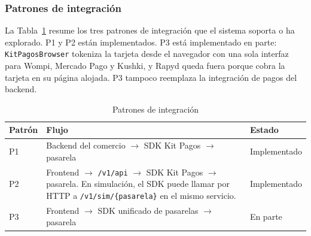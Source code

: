 \subsubsection{Patrones de integración}
La Tabla~\ref{tab:patrones} resume los tres patrones de integración que el sistema soporta o ha explorado. P1 y P2 están implementados. P3 está implementado en parte: \texttt{KitPagosBrowser} tokeniza la tarjeta desde el navegador con una sola interfaz para Wompi, Mercado Pago y Kushki, y Rapyd queda fuera porque cobra la tarjeta en su página alojada. P3 tampoco reemplaza la integración de pagos del backend.

\begin{table}[htbp]
\centering
\caption{Patrones de integración}
\label{tab:patrones}
\renewcommand{\arraystretch}{1.3}
\begin{tabularx}{\textwidth}{|l|X|l|}
\hline
\textbf{Patrón} & \textbf{Flujo} & \textbf{Estado} \\ \hline
P1 & Backend del comercio $\rightarrow$ SDK Kit Pagos $\rightarrow$ pasarela & Implementado \\ \hline
P2 & Frontend $\rightarrow$ \texttt{/v1/api} $\rightarrow$ SDK Kit Pagos $\rightarrow$ pasarela. En simulación, el SDK puede llamar por HTTP a \texttt{/v1/sim/\{pasarela\}} en el mismo servicio. & Implementado \\ \hline
P3 & Frontend $\rightarrow$ SDK unificado de pasarelas $\rightarrow$ pasarela & En parte \\ \hline
\end{tabularx}
\end{table}

